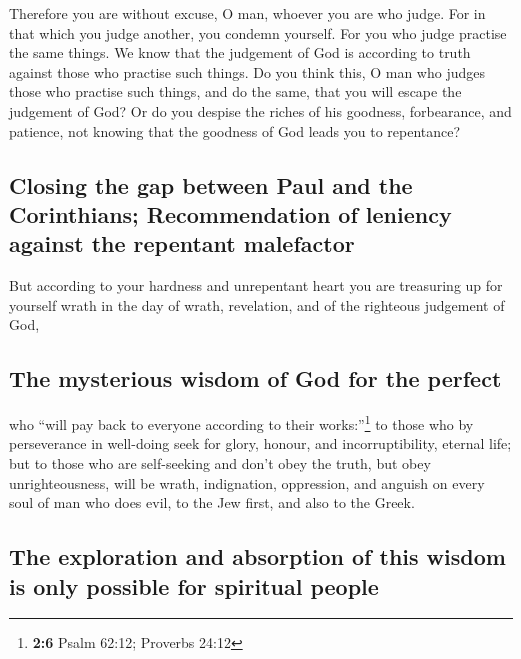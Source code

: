  Therefore you are without excuse, O man, whoever you are
who judge. For in that which you judge another, you condemn yourself.
For you who judge practise the same things.  We know that
the judgement of God is according to truth against those who practise
such things.  Do you think this, O man who judges those
who practise such things, and do the same, that you will escape the
judgement of God?  Or do you despise the riches of his
goodness, forbearance, and patience, not knowing that the goodness of
God leads you to repentance?

\hypertarget{closing-the-gap-between-paul-and-the-corinthians-recommendation-of-leniency-against-the-repentant-malefactor}{%
\subsection{Closing the gap between Paul and the Corinthians;
Recommendation of leniency against the repentant
malefactor}\label{closing-the-gap-between-paul-and-the-corinthians-recommendation-of-leniency-against-the-repentant-malefactor}}

 But according to your hardness and unrepentant heart you
are treasuring up for yourself wrath in the day of wrath, revelation,
and of the righteous judgement of God,

\hypertarget{the-mysterious-wisdom-of-god-for-the-perfect}{%
\subsection{The mysterious wisdom of God for the
perfect}\label{the-mysterious-wisdom-of-god-for-the-perfect}}

 who ``will pay back to everyone according to their
works:''\footnote{\textbf{2:6} Psalm 62:12; Proverbs 24:12}
 to those who by perseverance in well-doing seek for
glory, honour, and incorruptibility, eternal life;  but to
those who are self-seeking and don't obey the truth, but obey
unrighteousness, will be wrath, indignation,  oppression,
and anguish on every soul of man who does evil, to the Jew first, and
also to the Greek.

\hypertarget{the-exploration-and-absorption-of-this-wisdom-is-only-possible-for-spiritual-people}{%
\subsection{The exploration and absorption of this wisdom is only
possible for spiritual
people}\label{the-exploration-and-absorption-of-this-wisdom-is-only-possible-for-spiritual-people}}

